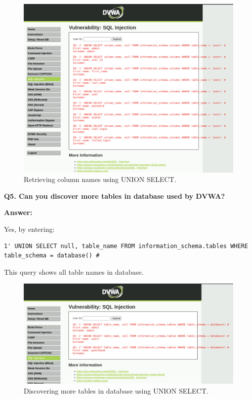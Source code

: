 \documentclass[12pt]{article}
\begin{document}
\begin{figure}[H]
    \centering
    \includegraphics[width=1.0\textwidth]{Screenshot3.png}
    \caption{Retrieving column names using UNION SELECT.}
\end{figure}

\textbf{Q5. Can you discover more tables in database used by DVWA?}

\textbf{Answer:}

Yes, by entering:

\begin{lstlisting}
1' UNION SELECT null, table_name FROM information_schema.tables WHERE table_schema = database() #
\end{lstlisting}

This query shows all table names in database.

\begin{figure}[H]
    \centering
    \includegraphics[width=1.0\textwidth]{Screenshot6.png}
    \caption{Discovering more tables in database using UNION SELECT.}
\end{figure}
\end{document}
